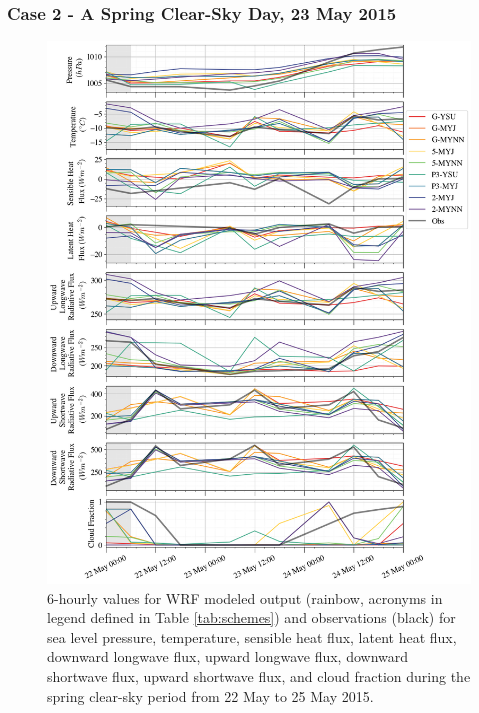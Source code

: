 \subsubsection{Case 2 - A Spring Clear-Sky Day, 23 May 2015}
\begin{figure}[p!]
    \centering 
        \vspace*{-2.5cm}
    \hspace*{-0.75cm} 
    \includegraphics[width=1.1\linewidth]{figures/chapter3/wrf_case2.png}
    \caption[Polar WRF Case 3 - Spring clear-sky (23 May 2015) time series]{6-hourly values for WRF modeled output (rainbow, acronyms in legend defined in Table \ref{tab:schemes}) and observations (black) for sea level pressure, temperature, sensible heat flux, latent heat flux, downward longwave flux, upward longwave flux, downward shortwave flux, upward shortwave flux, and cloud fraction during the spring clear-sky period from 22 May to 25 May 2015.}
    \label{fig:wrf_case2}
\end{figure}

